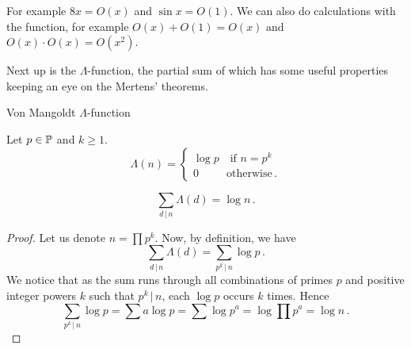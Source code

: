 \documentclass{article}
\begin{document}
For example $8x=O(x)$ and $\sin{x}=O(1)$. We can also do calculations with the function, for example $O(x)+O(1)=O(x)$ and $O(x)\cdot O(x) = O(x^2)$.

Next up is the $\Lambda$-function, the partial sum of which has some useful properties keeping an eye on the Mertens' theorems.

\begin{definition}
Von Mangoldt $\Lambda$-function

Let $p\in\mathbb{P}$ and $k\geq1$.
\begin{equation*}
    \Lambda(n) =
    \begin{cases}
    \log p \quad \text{if } n=p^k\\
    0 \quad\quad\,\,\, \text{otherwise}\,.
    \end{cases}
\end{equation*}
\end{definition}

\begin{theorem}
\label{thm:lambdaf}
\begin{equation*}
    \sum_{d\,\vert\, n} \Lambda(d) = \log n\,.
\end{equation*}
\begin{proof}
Let us denote $n=\prod p^k$. Now, by definition, we have
\begin{equation*}
    \sum_{d\,\vert\, n} \Lambda(d) = \sum_{p^k\,\vert\, n} \log p\,.
\end{equation*}
We notice that as the sum runs through all combinations of primes $p$ and positive integer powers $k$ such that $p^k\,\vert\, n$, each $\log p$ occurs $k$ times. Hence
\begin{equation*}
    \sum_{p^k\,\vert\, n} \log p = \sum a \log p = \sum \log p^a = \log \prod p^a = \log n\,.
\end{equation*}
\end{proof}
\end{theorem}
\end{document}
